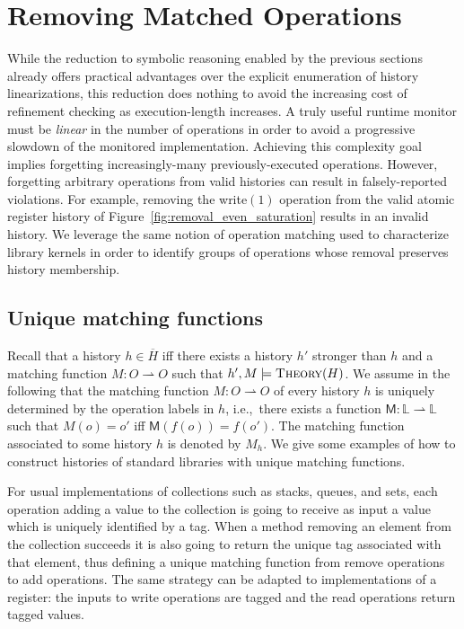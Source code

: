 \section{Removing Matched Operations}
\label{sec:obsolete}

While the reduction to symbolic reasoning enabled by the previous sections
already offers practical advantages over the explicit enumeration of history
linearizations, this reduction does nothing to avoid the increasing cost of
refinement checking as execution-length increases. A truly useful runtime
monitor must be \emph{linear} in the number of operations in order to avoid a
progressive slowdown of the monitored implementation. Achieving this complexity
goal implies forgetting increasingly-many previously-executed operations.
However, forgetting arbitrary operations from valid histories can result in
falsely-reported violations. For example, removing the write$(1)$
operation from the valid atomic register history of
Figure~\ref{fig:removal_even_saturation} results in an invalid history. We
leverage the same notion of operation matching used to characterize library
kernels in order to identify groups of operations whose removal preserves
history membership.

\subsection{Unique matching functions}

Recall that a history $h\in \overline{H}$ iff there exists a history $h'$
stronger than $h$ and a matching function $M : O \rightharpoonup O$ such that
$h',M\models \textsc{Theory}(H)$. We assume in the following that the 
matching function $M : O \rightharpoonup O$ of every history $h$ is uniquely determined 
by the operation labels in $h$, i.e.,~there exists a function
$\mathsf{M}:\mathbb{L} \rightharpoonup \mathbb{L}$ such that $M(o)=o'$ iff
$\mathsf{M}(f(o))=f(o')$. The matching function associated to some history $h$
is denoted by $M_h$. We give some examples of how to construct histories of
standard libraries with unique matching functions.

\begin{example}[Collections]

  For usual implementations of collections such as stacks, queues, and sets,
  each operation adding a value to the collection is going to receive as input
  a value which is uniquely identified by a tag. When a method removing an
  element from the collection succeeds it is also going to return the unique
  tag associated with that element, thus defining a unique matching function
  from remove operations to add operations. The same strategy can be adapted to
  implementations of a register: the inputs to write operations are tagged and
  the read operations return tagged values.

\end{example}

